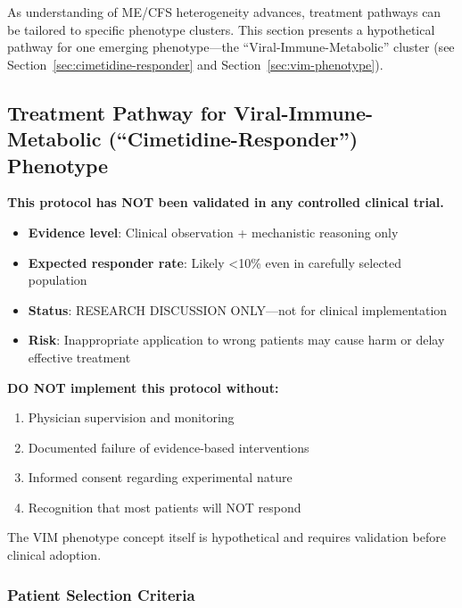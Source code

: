 As understanding of ME/CFS heterogeneity advances, treatment pathways can be tailored to specific phenotype clusters. This section presents a hypothetical pathway for one emerging phenotype---the ``Viral-Immune-Metabolic'' cluster (see Section~\ref{sec:cimetidine-responder} and Section~\ref{sec:vim-phenotype}).

\subsection{Treatment Pathway for Viral-Immune-Metabolic (``Cimetidine-Responder'') Phenotype}
\label{sec:vim-pathway}

\begin{warning}
\textbf{This protocol has NOT been validated in any controlled clinical trial.}

\begin{itemize}
    \item \textbf{Evidence level}: Clinical observation + mechanistic reasoning only
    \item \textbf{Expected responder rate}: Likely <10\% even in carefully selected population
    \item \textbf{Status}: RESEARCH DISCUSSION ONLY---not for clinical implementation
    \item \textbf{Risk}: Inappropriate application to wrong patients may cause harm or delay effective treatment
\end{itemize}

\textbf{DO NOT implement this protocol without:}
\begin{enumerate}
    \item Physician supervision and monitoring
    \item Documented failure of evidence-based interventions
    \item Informed consent regarding experimental nature
    \item Recognition that most patients will NOT respond
\end{enumerate}

The VIM phenotype concept itself is hypothetical and requires validation before clinical adoption.
\end{warning}

\subsubsection{Patient Selection Criteria}

